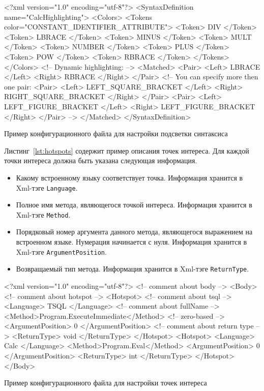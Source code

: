 \begin{listing}[H]
    \begin{pyglist}[language=xml,numbers=left,numbersep=5pt]
<?xml version="1.0" encoding="utf-8"?>
<SyntaxDefinition name="CalcHighlighting">
    <Colors>
        <Tokens color="CONSTANT_IDENTIFIER_ATTRIBUTE">
            <Token> DIV </Token>
            <Token> LBRACE </Token>
            <Token> MINUS </Token>
            <Token> MULT </Token>
            <Token> NUMBER </Token>
            <Token> PLUS </Token>
            <Token> POW </Token>
            <Token> RBRACE </Token>
        </Tokens>
    </Colors>
<!-- Dynamic highlighting: -->
    <Matched>
        <Pair>
            <Left> LBRACE </Left>
            <Right> RBRACE </Right>
        </Pair>
<!-- You can specify more then one pair:        
        <Pair>
            <Left> LEFT_SQUARE_BRACKET </Left>
            <Right> RIGHT_SQUARE_BRACKET </Right>
        </Pair>
        <Pair>
            <Left> LEFT_FIGURE_BRACKET </Left>
            <Right> LEFT_FIGURE_BRACKET </Right>
        </Pair>
-->        
    </Matched>
</SyntaxDefinition>
    \end{pyglist}
\caption{Пример конфигурационного файла для настройки подсветки синтаксиса}
\label{lst:codeHighlighting}
\end{listing}

Листинг~\ref{lst:hotspots} содержит пример описания точек интереса. Для каждой точки интереса должна быть указана следующая информация.
\begin{itemize}
    \item Какому встроенному языку соответствует точка. Информация хранится в Xml-тэге \verb|Language|.
    \item Полное имя метода, являющегося точкой интереса. Информация хранится в Xml-тэге \verb|Method|.
    \item Порядковый номер аргумента данного метода, являющегося выражением на встроенном языке. Нумерация начинается с нуля. Информация хранится в Xml-тэге \verb|ArgumentPosition|. 
    \item Возвращаемый тип метода.  Информация хранится в Xml-тэге \verb|ReturnType|. 
\end{itemize}

\begin{listing}[H]
    \begin{pyglist}[language=xml,numbers=left,numbersep=5pt]
<?xml version="1.0" encoding="utf-8"?>
<!-- comment about body -->
<Body>
    <!-- comment about hotspot -->
  <Hotspot>
      <!-- comment about tsql -->
      <Language> TSQL </Language>
      <!-- comment about fullName -->
      <Method>Program.ExecuteImmediate</Method>
      <!-- zero-based -->
      <ArgumentPosition> 0 </ArgumentPosition>
      <!-- comment about return type -->
      <ReturnType> void </ReturnType>
  </Hotspot>
  <Hotspot>
      <Language> Calc </Language>
      <Method>Program.Eval</Method>
      <ArgumentPosition> 0 </ArgumentPosition>
      <ReturnType> int </ReturnType>
  </Hotspot>
</Body>
    \end{pyglist}
\caption{Пример конфигурационного файла для настройки точек интереса}
\label{lst:hotspots}
\end{listing}


